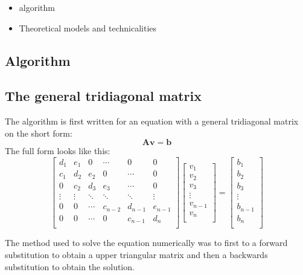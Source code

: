 \begin{itemize}

\item algorithm

\item Theoretical models and technicalities

\end{itemize}

\subsection{Algorithm}

\subsection{The general tridiagonal matrix}
The algorithm is first written for an equation with a general tridiagonal matrix on the short form:
\[
\mathbf{A}\mathbf{v}=\mathbf{b}
\]
The full form looks like this:
\[
    \begin{bmatrix}
    	d_1& e_1& 0 &\cdots & 0 &0 \\
        c_1 & d_2 & e_2 &0 &\cdots &0 \\
        0&c_2 &d_3 & e_3 & \cdots & 0 \\
        \vdots& \vdots & \ddots &\ddots &\ddots & \vdots \\
        0&0 & \cdots &c_{n-2} &d_{n-1}& e_{n-1} \\
        0&0 & \cdots & 0  &c_{n-1} & d_n \\
        \end{bmatrix}
\begin{bmatrix}
	v_1\\
	v_2\\
	v_3\\
	\vdots\\
	v_{n-1}\\
	v_{n}\\
\end{bmatrix}=
\begin{bmatrix}
	b_1\\
	b_2\\
	b_3\\
	\vdots\\
	b_{n-1}\\
	b_{n}\\
\end{bmatrix}
\]

The method used to solve the equation numerically was to first to a forward substitution to obtain a upper triangular matrix and then a backwards substitution to obtain the solution.


